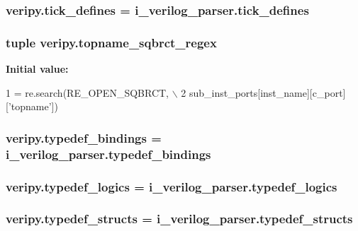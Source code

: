 \hypertarget{namespaceveripy_aaa9e0a3d2b05e047d295ee78848b3a89}{
\subsubsection[{tick\-\_\-defines}]{\setlength{\rightskip}{0pt plus 5cm}veripy.\-tick\-\_\-defines = i\-\_\-verilog\-\_\-parser.\-tick\-\_\-defines}}\label{namespaceveripy_aaa9e0a3d2b05e047d295ee78848b3a89}
\hypertarget{namespaceveripy_a6b7c63fe728396ebc9152876b49a06d0}{
\subsubsection[{topname\-\_\-sqbrct\-\_\-regex}]{\setlength{\rightskip}{0pt plus 5cm}tuple veripy.\-topname\-\_\-sqbrct\-\_\-regex}}\label{namespaceveripy_a6b7c63fe728396ebc9152876b49a06d0}
{\bfseries Initial value\-:}
\begin{DoxyCode}
1 = re.search(RE\_OPEN\_SQBRCT, \(\backslash\)
2                         sub\_inst\_ports[inst\_name][c\_port][\textcolor{stringliteral}{'topname'}])
\end{DoxyCode}
\hypertarget{namespaceveripy_a680f37dc5088c673d909d0871aa4d9a1}{
\subsubsection[{typedef\-\_\-bindings}]{\setlength{\rightskip}{0pt plus 5cm}veripy.\-typedef\-\_\-bindings = i\-\_\-verilog\-\_\-parser.\-typedef\-\_\-bindings}}\label{namespaceveripy_a680f37dc5088c673d909d0871aa4d9a1}
\hypertarget{namespaceveripy_abc6a77d9ee05e424592ceb571f2b4dae}{
\subsubsection[{typedef\-\_\-logics}]{\setlength{\rightskip}{0pt plus 5cm}veripy.\-typedef\-\_\-logics = i\-\_\-verilog\-\_\-parser.\-typedef\-\_\-logics}}\label{namespaceveripy_abc6a77d9ee05e424592ceb571f2b4dae}
\hypertarget{namespaceveripy_a71e44f2f7882785c63f3a572b2d1dc95}{
\subsubsection[{typedef\-\_\-structs}]{\setlength{\rightskip}{0pt plus 5cm}veripy.\-typedef\-\_\-structs = i\-\_\-verilog\-\_\-parser.\-typedef\-\_\-structs}}\label{namespaceveripy_a71e44f2f7882785c63f3a572b2d1dc95}
